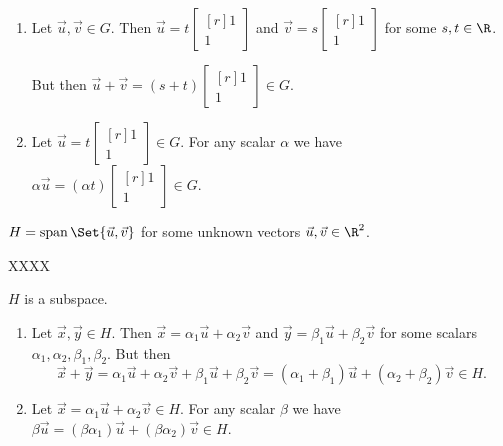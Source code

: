 \documentclass{problemset}
\DeclareMathOperator{\Span}{span}
\newcommand{\mat}[1]{\begin{bmatrix*}[r]#1\end{bmatrix*}}
\begin{document}
\begin{parts}
\begin{solution}
				\begin{enumerate}[label=(\roman*)]
					\item Let $\vec u,\vec v\in G$. Then $\vec u=t\mat{1\\1}$ and
						$\vec v=s\mat{1\\1}$ for some $s,t\in\R$. 

						But then $\vec u+\vec v=(s+t)\mat{1\\1}\in G$. 
					\item Let $\vec u=t\mat{1\\1}\in G$. For any scalar $\alpha$
						we have $\alpha\vec u=(\alpha t)\mat{1\\1}\in G$. 
				\end{enumerate}

		\end{solution}
		\item $H=\Span\Set{\vec u,\vec v}$ for some unknown vectors $\vec u,\vec v\in\R^2$.
			\begin{solution}
				XXXX
					
				$H$ is a subspace. 

				\begin{enumerate}[label=(\roman*)]
					\item Let $\vec x,\vec y\in H$.
						Then $\vec x=\alpha_1\vec u+\alpha_2\vec v$ and 
						$\vec y=\beta_1\vec u+\beta_2\vec v$ for some scalars 
						$\alpha_1,\alpha_2,\beta_1,\beta_2$. But then
						\[
							\vec x+\vec y
							=\alpha_1\vec u+\alpha_2\vec v+\beta_1\vec u+\beta_2\vec v
							=(\alpha_1+\beta_1)\vec u+(\alpha_2+\beta_2)\vec v\in H.
						\]

					\item Let $\vec x=\alpha_1\vec u+\alpha_2\vec v\in H$.
						For any	scalar $\beta$ we have 
						$\beta\vec u=(\beta\alpha_1)\vec u+(\beta\alpha_2)\vec v\in H$.
				\end{enumerate}
			\end{solution}
	\end{parts}
\end{document}

